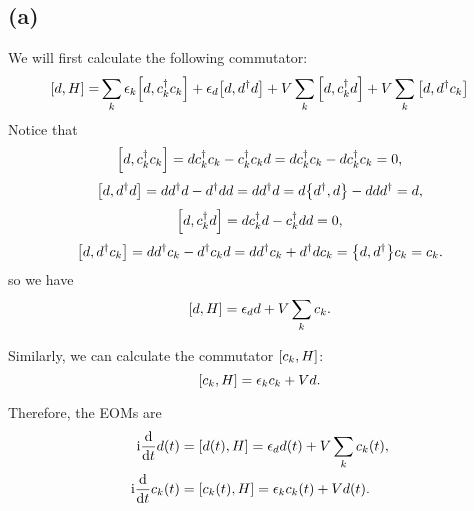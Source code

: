 \documentclass{article}
\newcommand{\ii}{\mathrm{i}}
\begin{document}
\subsection*{(a)}
We will first calculate the following commutator:
\begin{equation}
    \begin{split}
        \comm{d}{H}=&\sum_{k}\epsilon_k \comm{d}{c_k^\dagger c_k}+\epsilon_d \comm{d}{d^\dagger d}+V\sum_k \comm{d}{c_k^\dagger d}+V\sum_k \comm{d}{d^\dagger c_k}\\
    \end{split}
\end{equation}
Notice that 
\begin{equation}
    \comm{d}{c_k^\dagger c_k}=d c_k^\dagger c_k - c_k^\dagger c_k d=d c_k^\dagger c_k-d c_k^\dagger c_k=0,
\end{equation}
\begin{equation}
    \comm{d}{d^\dagger d}=d d^\dagger d - d^\dagger d d=dd^\dagger d=d\acomm{d^\dagger}{d}-ddd^\dagger=d,
\end{equation}
\begin{equation}
    \comm{d}{c_k^\dagger d}=d c_k^\dagger d - c_k^\dagger d d=0,
\end{equation}
\begin{equation}
    \comm{d}{d^\dagger c_k}=d d^\dagger c_k - d^\dagger c_k d=dd^\dagger c_k + d^\dagger d c_k=\acomm{d}{d^\dagger}c_k=c_k.
\end{equation}
so we have
\begin{equation}
    \comm{d}{H}=\epsilon_d d + V\sum_k c_k.
\end{equation}

Similarly, we can calculate the commutator $\comm{c_k}{H}$:
\begin{equation}
    \comm{c_k}{H}=\epsilon_k c_k + V d.
\end{equation}

Therefore, the EOMs are 
\begin{subequations}
    \begin{align}
        \ii \dv{t}d(t)&=\comm{d(t)}{H}=\epsilon_d d(t) + V\sum_k c_k(t),\\
        \ii \dv{t}c_k(t)&=\comm{c_k(t)}{H}=\epsilon_k c_k(t) + V d(t).
    \end{align}
\end{subequations}
\end{document}
